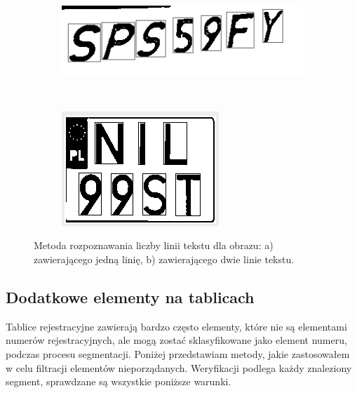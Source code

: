 \begin{figure}
  \centering
  \begin{subfigure}[b]{0.45\textwidth}
    \includegraphics[width=\textwidth]{img/apriori-liczba-linii-jeden}
    \label{fig:apriori_liczba_linii_jeden}
    \caption{}
  \end{subfigure}
  ~
  \begin{subfigure}[b]{0.45\textwidth}
    \includegraphics[width=\textwidth]{img/apriori-liczba-linii-dwa}
    \label{fig:apriori_liczba_linii_dwa}
    \caption{}
  \end{subfigure}
  \caption{Metoda rozpoznawania liczby linii tekstu dla obrazu: a) zawierającego jedną linię, b) zawierającego dwie linie tekstu.}
  \label{fig:apriori_liczba_linii}
\end{figure}

\subsection{Dodatkowe elementy na tablicach}
Tablice rejestracyjne zawierają bardzo często elementy, które nie są elementami numerów rejestracyjnych, ale mogą zostać sklasyfikowane jako element numeru, podczas procesu segmentacji. Poniżej przedstawiam metody, jakie zastosowałem w celu filtracji elementów nieporządanych. Weryfikacji podlega każdy znaleziony segment, sprawdzane są wszystkie poniższe warunki.
